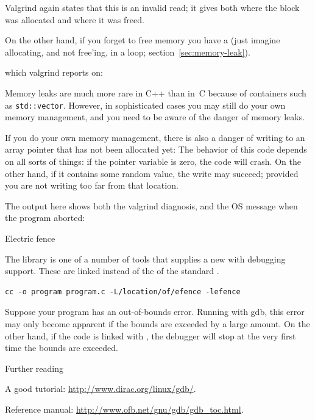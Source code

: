 Valgrind again states that this is an invalid read;
it gives both where the block was allocated and where it was freed.
%


On the other hand, if you forget to free memory you have a
(just imagine allocating, and not free'ing, in a loop; section~\ref{sec:memory-leak}).
%

which valgrind reports on:
%


Memory leaks are much more rare in C++ than in~C
because of containers such as \lstinline{std::vector}.
However, in sophisticated cases you may still do your own
memory management, and you need to be aware of the danger of memory leaks.

If you do your own memory management, there is also a danger
of writing to an array pointer that has not been allocated yet:
%
%
The behavior of this code depends on all sorts of things:
if the pointer variable is zero, the code will crash.
On the other hand, if it contains some random value,
the write may succeed; provided you are not writing
too far from that location.

The output here shows both the valgrind diagnosis,
and the \ac{OS} message when the program aborted:
%



 {Electric fence}

The  library is one of a number of tools
that supplies a new  with debugging support.
These are linked instead of the  of the standard
.

\begin{verbatim}
cc -o program program.c -L/location/of/efence -lefence
\end{verbatim}

Suppose your program has an out-of-bounds error. Running with gdb,
this error may only become apparent if the bounds are exceeded by a
large amount. On the other hand, if the code is linked with
, the debugger will stop at the very first time
the bounds are exceeded.

 {Further reading}

A good tutorial: \url{http://www.dirac.org/linux/gdb/}.

Reference manual: \url{http://www.ofb.net/gnu/gdb/gdb_toc.html}.


